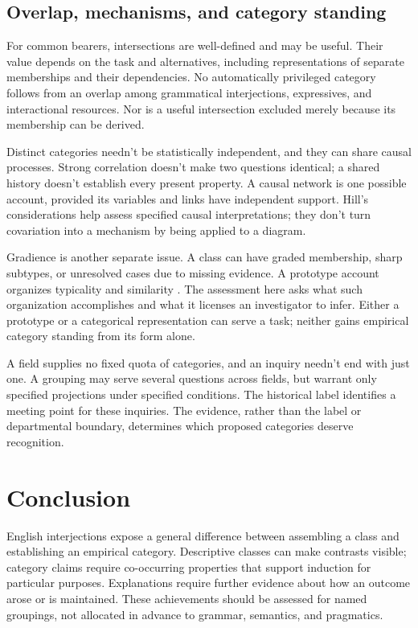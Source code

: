 \documentclass[12pt]{article}
\begin{document}
\subsection{Overlap, mechanisms, and category standing}

For common bearers, intersections are well-defined and may be useful.
Their value depends on the task and alternatives, including representations
of separate memberships and their dependencies. No automatically privileged
category follows from an overlap among grammatical interjections,
expressives, and interactional resources. Nor is a useful intersection
excluded merely because its membership can be derived.

Distinct categories needn't be statistically independent, and they can
share causal processes. Strong correlation doesn't make two questions
identical; a shared history doesn't establish every present property.
A causal network is one possible account, provided its variables and
links have independent support. Hill's considerations help assess
specified causal interpretations; they don't turn covariation into
a mechanism by being applied to a diagram.

Gradience is another separate issue. A class can have graded membership,
sharp subtypes, or unresolved cases due to missing evidence. A prototype
account organizes typicality and similarity \citep{rosch1975,taylor2003}.
The assessment here asks what such organization accomplishes and what
it licenses an investigator to infer. Either a prototype or a categorical
representation can serve a task; neither gains empirical category standing
from its form alone.

A field supplies no fixed quota of categories, and an inquiry
needn't end with just one. A grouping may serve several questions across
fields, but warrant only specified projections under specified conditions.
The historical label  identifies a meeting point for
these inquiries. The evidence, rather than the label or departmental
boundary, determines which proposed categories deserve recognition.

\section{Conclusion}\label{sec:conclusion}

English interjections expose a general difference between assembling a
class and establishing an empirical category. Descriptive classes can
make contrasts visible; category claims require co-occurring properties
that support induction for particular purposes. Explanations require
further evidence about how an outcome arose or is maintained. These
achievements should be assessed for named groupings, not allocated in
advance to grammar, semantics, and pragmatics.
\end{document}
